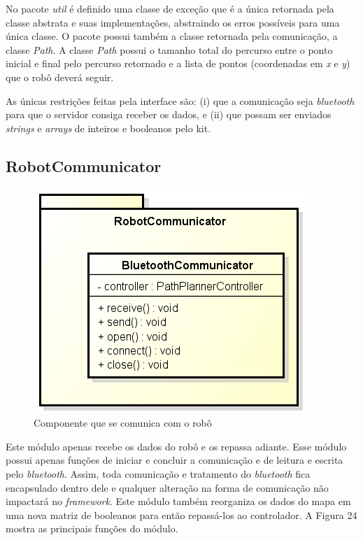 No pacote \textit{util} é definido uma classe de exceção que é a única retornada pela classe abstrata e suas implementações, abstraindo os erros possíveis para uma única classe. O pacote possui também a classe retornada pela comunicação, a classe \textit{Path}. A classe \textit{Path} possui o tamanho total do percurso entre o ponto inicial e final pelo percurso retornado e a lista de pontos (coordenadas em \textit{x} e \textit{y}) que o robô deverá seguir.

As únicas restrições feitas pela interface são: (i) que a comunicação seja \textit{bluetooth} para que o servidor consiga receber os dados, e (ii) que possam ser enviados \textit{strings} e \textit{arrays} de inteiros e booleanos pelo kit.

\subsection{RobotCommunicator}

\begin{figure}[h]
	\centering
	\label{fig24}
		\includegraphics[keepaspectratio=true,scale=0.6]{figuras/tcp.png}
	\caption{Componente que se comunica com o robô}
\end{figure}

Este módulo apenas recebe os dados do robô e os repassa adiante. Esse módulo possui apenas funções de iniciar e concluir a comunicação e de leitura e escrita pelo \textit{bluetooth}. Assim, toda comunicação e tratamento do \textit{bluetooth} fica encapsulado dentro dele e qualquer alteração na forma de comunicação não impactará no \textit{framework}. Este módulo também reorganiza os dados do mapa em uma nova matriz de booleanos para então repassá-los ao controlador. A Figura 24 mostra as principais funções do módulo.


